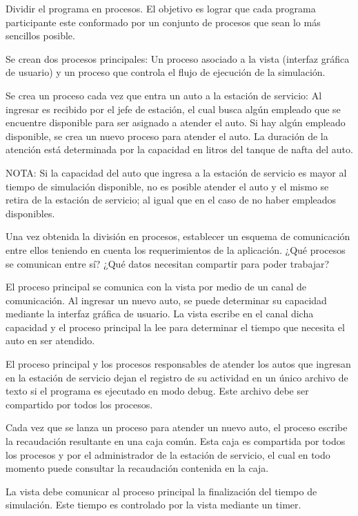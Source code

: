 \documentclass[12pt,a4paper,titlepage,oneside]{article}
\renewenvironment{itemize}{
 \begin{list}{}{
  \setlength{\leftmargin}{1.5em}
 }
}{
 \end{list}
}
\begin{document}
\begin{enumerate}
\item Dividir el programa en procesos. El objetivo es lograr que cada programa participante este conformado por un conjunto de procesos que sean lo más sencillos posible.

\begin{itemize}
\item[•] Se crean dos procesos principales: Un proceso asociado a la vista (interfaz gráfica de usuario) y un proceso que controla el flujo de ejecución de la simulación.
\item[•] Se crea un proceso cada vez que entra un auto a la estación de servicio: Al ingresar es recibido por el jefe de estación, el cual busca algún empleado que se encuentre disponible para ser asignado a atender el auto. Si hay algún empleado disponible, se crea un nuevo proceso para atender el auto. La duración de la atención está determinada por la capacidad en litros del tanque de nafta del auto.
\end{itemize}

NOTA: Si la capacidad del auto que ingresa a la estación de servicio es mayor al tiempo de simulación disponible, no es posible atender el auto y el mismo se retira de la estación de servicio; al igual que en el caso de no haber empleados disponibles.

\item Una vez obtenida la división en procesos, establecer un esquema de comunicación entre ellos teniendo en cuenta los requerimientos de la aplicación. ¿Qué procesos se comunican entre sí? ¿Qué datos necesitan compartir para poder trabajar?

\begin{itemize}
\item[•] El proceso principal se comunica con la vista por medio de un canal de comunicación. Al ingresar un nuevo auto, se puede determinar su capacidad mediante la interfaz gráfica de usuario. La vista escribe en el canal dicha capacidad y el proceso principal la lee para determinar el tiempo que necesita el auto en ser atendido.
\item[•] El proceso principal y los procesos responsables de atender los autos que ingresan en la estación de servicio dejan el registro de su actividad en un único archivo de texto si el programa es ejecutado en modo debug. Este archivo debe ser compartido por todos los procesos.
\item[•] Cada vez que se lanza un proceso para atender un nuevo auto, el proceso escribe la recaudación resultante en una caja común. Esta caja es compartida por todos los procesos y por el administrador de la estación de servicio, el cual en todo momento puede consultar la recaudación contenida en la caja.
\item[•] La vista debe comunicar al proceso principal la finalización del tiempo de simulación. Este tiempo es controlado por la vista mediante un timer.
\end{itemize}


\end{enumerate}
\end{document}
